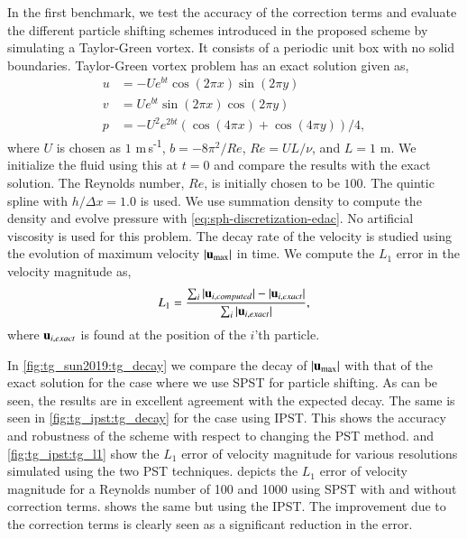 In the first benchmark, we test the accuracy of the correction terms and
evaluate the different particle shifting schemes introduced in the proposed
scheme by simulating a Taylor-Green vortex. It consists of a periodic unit box
with no solid boundaries. Taylor-Green vortex problem has an exact solution
given as,
\begin{align}
  \label{eq:tgv_sol}
  u &= - U e^{bt} \cos(2 \pi x) \sin(2 \pi y) \\
  v &=   U e^{bt}\sin(2 \pi x) \cos(2 \pi y) \\
  p &=  -U^2 e^{2bt} (\cos(4 \pi x) + \cos(4 \pi y))/4,
\end{align}
where $U$ is chosen as $1$ m\,s\textsuperscript{-1}, $b=-8\pi^2/Re$, $Re=U L /\nu$,
and $L=1$ m. We initialize the fluid using this at $t=0$ and compare the
results with the exact solution. The Reynolds number, $Re$, is initially
chosen to be $100$. The quintic spline with $h/\Delta x = 1.0$ is used. We use
summation density to compute the density and evolve pressure with
\cref{eq:sph-discretization-edac}. No artificial viscosity is used for this
problem.
%
%
The decay rate of the velocity is studied using the evolution of maximum
velocity $|\mathbf{u}_{\max}|$ in time. We compute the $L_1$ error in the
velocity magnitude as,
\begin{equation}
  \label{eq:tg:l1}
  L_1 = \frac{\sum_i |\mathbf{u}_{i, computed}| - |\mathbf{u}_{i, exact}|}
  {\sum_i |\mathbf{u}_{i, exact}|},
\end{equation}
where $\mathbf{u}_{i, exact}$ is found at the position of the $i$'th particle.


In \cref{fig:tg_sun2019:tg_decay} we compare the decay of $|\mathbf{u}_{\max}|$
with that of the exact solution for the case where we use SPST for particle
shifting. As can be seen, the results are in excellent agreement with the
expected decay. The same is seen in \cref{fig:tg_ipst:tg_decay} for the case
using IPST. This shows the accuracy and robustness of the scheme with respect
to changing the PST method.  and
\cref{fig:tg_ipst:tg_l1} show the $L_1$ error of velocity magnitude for
various resolutions simulated using the two PST techniques.
 depicts the $L_1$ error of velocity
magnitude for a Reynolds number of 100 and 1000 using SPST with and without
correction terms.  shows the same but
using the IPST. The improvement due to the correction terms is clearly seen
as a significant reduction in the error.


